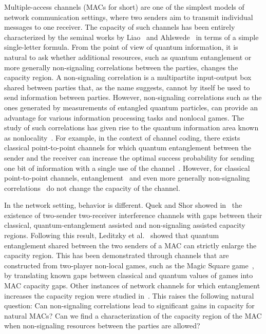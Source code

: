 Multiple-access channels (MACs for short) are one of the simplest models of network communication settings, where two senders aim to transmit individual messages to one receiver. The capacity of such channels has been entirely characterized by the seminal works by Liao~\cite{Liao73} and Ahlswede~\cite{Ahlswede73} in terms of a simple single-letter formula. From the point of view of quantum information, it is natural to ask whether additional resources, such as quantum entanglement or more generally non-signaling correlations between the parties, changes the capacity region. %
A non-signaling correlation is a multipartite input-output box shared between parties that, as the name suggests, cannot by itself be used to send information between parties. However, non-signaling correlations such as the ones generated by measurements of entangled quantum particles, can provide an advantage for various information processing tasks and nonlocal games. The study of such correlations has given rise to the quantum information area known as nonlocality~\cite{BCPSW14}. For example, in the context of channel coding, there exists classical point-to-point channels for which quantum entanglement between the sender and the receiver can increase the optimal success probability for sending one bit of information with a single use of the channel~\cite{PLMKR11,BF18}. However, for classical point-to-point channels, entanglement~\cite{BBCJPW93,BSST99} and even more generally non-signaling correlations~\cite{Matthews12} do not change the capacity of the channel.

In the network setting, behavior is different. Quek and Shor showed in~\cite{QS17} the existence of two-sender two-receiver interference channels with gaps between their classical, quantum-entanglement assisted and non-signaling assisted capacity regions. Following this result, Leditzky et al.~\cite{LALS20,SLSS22} showed that quantum entanglement shared between the two senders of a MAC can strictly enlarge the capacity region. This has been demonstrated through channels that are constructed from two-player non-local games, such as the Magic Square game~\cite{Mermin90,Peres90,Aravind02,BBT05}, by translating known gaps between classical and quantum values of games into MAC capacity gaps. Other instances of network channels for which entanglement increases the capacity region were studied in~\cite{Noetzel20,ND20}. %
This raises the following natural question: Can non-signaling correlations lead to significant gains in capacity for natural MACs? Can we find a characterization of the capacity region of the MAC when non-signaling resources between the parties are allowed? 

